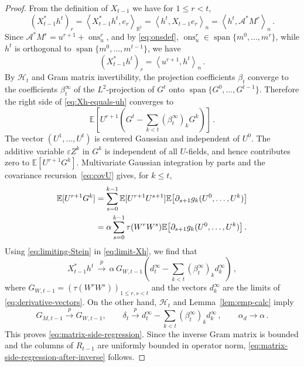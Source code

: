 \documentclass[11pt]{article}
\theoremstyle{definition}
\theoremstyle{remark}
\numberwithin{equation}{section}
\numberwithin{theorem}{section}
\newcommand{\R}{\mathbb R}
\newcommand{\E}{\mathbb E}
\newcommand{\Span}{\operatorname{span}}
\newcommand{\ip}[2]{\left\langle #1,#2\right\rangle}
\newcommand{\taup}{\tau}
\newcommand{\cA}{\mathcal A}
\newcommand{\ons}{\operatorname{ons}}
\newcommand{\xto}{\xrightarrow}
\newcommand{\eps}{\varepsilon}
\begin{document}
\begin{proof}
From the definition of $X_{t-1}$ we have for $1\le r<t$, 
\begin{equation}
  (X_{t-1}^*h^t)_r = \ip{X_{t-1}^*h^t}{e_r}_{\R^t} = \ip{h^t}{X_{t-1}e_r}_{n} 
  =\ip{h^t}{\cA^*M^r}_n\,.
\end{equation}
Since $\cA^*M^r=u^{r+1}+\ons_u^r$, and by \eqref{eq:onsdef}, $\ons_u^r\in\Span\{m^0,\ldots,m^r\}$, while $h^t$ is orthogonal to $\Span\{m^0,\ldots,m^{t-1}\}$, we have
\begin{equation}\label{eq:Xh-equals-uh}
(X_{t-1}^*h^t)_r =\ip{u^{r+1}}{h^t}_n\,.
\end{equation}
By $\mathcal{H}_{t}$ and Gram matrix invertibility, the projection coefficients $\beta_t$ converge to the coefficients $\beta_t^\infty$ of the $L^2$-projection of $G^t$ onto $\Span\{G^0,\ldots,G^{t-1}\}$. Therefore the right side of \eqref{eq:Xh-equals-uh} converges to
\begin{equation}\label{eq:limit-Xh}
  \E\left[U^{r+1}
  \left(G^t-\sum_{k<t}(\beta_t^\infty)_kG^k\right)\right]\,.
\end{equation}
 The vector $(U^1,\ldots,U^t)$ is centered Gaussian and independent of $U^0$. The additive variable $\eps Z^k$ in $G^k$ is independent of all
$U$-fields, and hence contributes zero to $\E[U^{r+1}G^k]$. Multivariate Gaussian integration by parts and the covariance recursion~\eqref{eq:covU} gives, for $k\le t$,
\begin{align}
  \E[U^{r+1}G^k]
  &=\sum_{s=0}^{k-1}
    \E[U^{r+1}U^{s+1}]
    \E\bigl[\partial_{s+1}g_k(U^0,\ldots,U^k)\bigr] \notag\\
  &=\alpha\sum_{s=0}^{k-1}
    \taup(W^r W^s)
    \E\bigl[\partial_{s+1}g_k(U^0,\ldots,U^k)\bigr]\,.
  \label{eq:limiting-Stein}
\end{align}
Using \eqref{eq:limiting-Stein} in \eqref{eq:limit-Xh}, we find that 
\[
  X_{t-1}^*h^t \,\xto{p} \,\alpha\, G_{W,t-1}
  \left(d_t^\infty-\sum_{k<t}(\beta_t^\infty)_kd_k^\infty\right)\,,
\]
where $G_{W,t-1}=(\taup(W^rW^s))_{1\le r,s<t}$ and the vectors $d_k^\infty$ are the limits of \eqref{eq:derivative-vectors}.  On the other hand, $\mathcal{H}_t$ and Lemma~\ref{lem:emp-calc} imply
\[
  G_{M,t-1}\xto{p}G_{W,t-1},
  \qquad
  \delta_t\xto{p}
  d_t^\infty-\sum_{k<t}(\beta_t^\infty)_kd_k^\infty\,,
  \qquad
  \alpha_d\to\alpha\,.
\]
This proves \eqref{eq:matrix-side-regression}.  Since the inverse Gram matrix is bounded and the columns of $R_{t-1}$ are uniformly bounded in operator norm, \eqref{eq:matrix-side-regression-after-inverse} follows.
\end{proof}
\end{document}
